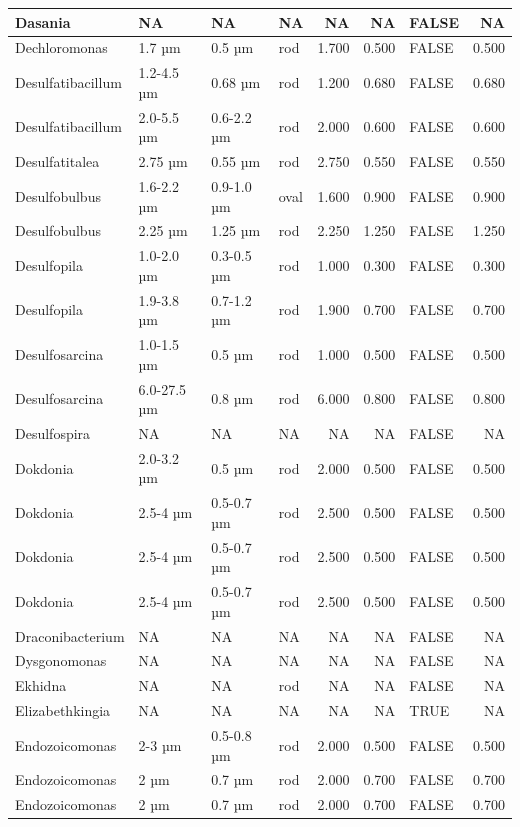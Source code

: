 \documentclass[
]{article}
\begin{document}
\begin{table}
\begin{tabular}{l|l|l|l|r|r|l|r}
\hline
Dasania & NA & NA & NA & NA & NA & FALSE & NA\\
\hline
Dechloromonas & 1.7 µm & 0.5 µm & rod & 1.700 & 0.500 & FALSE & 0.500\\
\hline
Desulfatibacillum & 1.2-4.5 µm & 0.68 µm & rod & 1.200 & 0.680 & FALSE & 0.680\\
\hline
Desulfatibacillum & 2.0-5.5 µm & 0.6-2.2 µm & rod & 2.000 & 0.600 & FALSE & 0.600\\
\hline
Desulfatitalea & 2.75 µm & 0.55 µm & rod & 2.750 & 0.550 & FALSE & 0.550\\
\hline
Desulfobulbus & 1.6-2.2 µm & 0.9-1.0 µm & oval & 1.600 & 0.900 & FALSE & 0.900\\
\hline
Desulfobulbus & 2.25 µm & 1.25 µm & rod & 2.250 & 1.250 & FALSE & 1.250\\
\hline
Desulfopila & 1.0-2.0 µm & 0.3-0.5 µm & rod & 1.000 & 0.300 & FALSE & 0.300\\
\hline
Desulfopila & 1.9-3.8 µm & 0.7-1.2 µm & rod & 1.900 & 0.700 & FALSE & 0.700\\
\hline
Desulfosarcina & 1.0-1.5 µm & 0.5 µm & rod & 1.000 & 0.500 & FALSE & 0.500\\
\hline
Desulfosarcina & 6.0-27.5 µm & 0.8 µm & rod & 6.000 & 0.800 & FALSE & 0.800\\
\hline
Desulfospira & NA & NA & NA & NA & NA & FALSE & NA\\
\hline
Dokdonia & 2.0-3.2 µm & 0.5 µm & rod & 2.000 & 0.500 & FALSE & 0.500\\
\hline
Dokdonia & 2.5-4 µm & 0.5-0.7 µm & rod & 2.500 & 0.500 & FALSE & 0.500\\
\hline
Dokdonia & 2.5-4 µm & 0.5-0.7 µm & rod & 2.500 & 0.500 & FALSE & 0.500\\
\hline
Dokdonia & 2.5-4 µm & 0.5-0.7 µm & rod & 2.500 & 0.500 & FALSE & 0.500\\
\hline
Draconibacterium & NA & NA & NA & NA & NA & FALSE & NA\\
\hline
Dysgonomonas & NA & NA & NA & NA & NA & FALSE & NA\\
\hline
Ekhidna & NA & NA & rod & NA & NA & FALSE & NA\\
\hline
Elizabethkingia & NA & NA & NA & NA & NA & TRUE & NA\\
\hline
Endozoicomonas & 2-3 µm & 0.5-0.8 µm & rod & 2.000 & 0.500 & FALSE & 0.500\\
\hline
Endozoicomonas & 2 µm & 0.7 µm & rod & 2.000 & 0.700 & FALSE & 0.700\\
\hline
Endozoicomonas & 2 µm & 0.7 µm & rod & 2.000 & 0.700 & FALSE & 0.700\\

\end{tabular}
\end{table}
\end{document}
